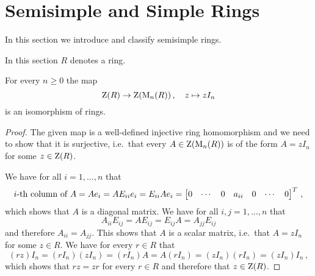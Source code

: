 \section{Semisimple and Simple Rings}


\begin{fluff}
  In this section we introduce and classify semisimple rings.
\end{fluff}


\begin{conventions}
  In this section $R$ denotes a ring.
\end{conventions}


\begin{lemma}
  \label{lemma: center of matrix ring}
  For every $n \geq 0$ the map
  \[
            \operatorname{Z}(R)
    \to     \operatorname{Z}(\operatorname{M}_n(R))  \,,
    \quad   z
    \mapsto z I_n
  \]
  is an isomorphism of rings.
\end{lemma}


\begin{proof}
  The given map is a well-defined injective ring homomorphism and we need to show that it is surjective, i.e.\ that every $A \in \operatorname{Z}(\operatorname{M}_n(R))$ is of the form $A = z I_n$ for some $z \in \operatorname{Z}(R)$.
  
  We have for all $i = 1, \dotsc, n$ that
  \[
      \text{$i$-th column of $A$}
    = A e_i
    = A E_{ii} e_i
    = E_{ii} A e_i
    = \begin{bmatrix} 0 & \cdots & 0 & a_{ii} & 0 & \cdots & 0\end{bmatrix}^T \,,
  \]
  which shows that $A$ is a diagonal matrix.
  We have for all $i,j = 1, \dotsc, n$ that
  \[
      A_{ii} E_{ij}
    = A E_{ij}
    = E_{ij} A
    = A_{jj} E_{ij}
  \]
  and therefore $A_{ii} = A_{jj}$.
  This shows that $A$ is a scalar matrix, i.e.\ that $A = zI_n$ for some $z \in R$.
  We have for every $r \in R$ that
  \[
      (rz) I_n
    = (r I_n) (z I_n)
    = (r I_n) A
    = A (r I_n)
    = (z I_n) (r I_n)
    = (z I_n) I_n \,,
  \]
  which shows that $rz = zr$ for every $r \in R$ and therefore that $z \in \operatorname{Z}(R)$.
\end{proof}









